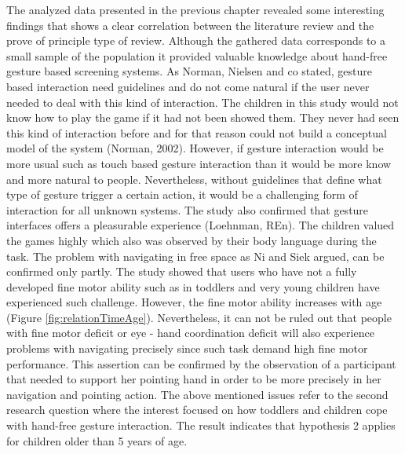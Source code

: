 The analyzed data presented in the previous chapter revealed some interesting findings that shows a clear correlation between the literature review and the prove of principle type of review. Although the gathered data corresponds to a small sample of the population it provided valuable knowledge about hand-free gesture based screening systems. As Norman, Nielsen and co stated, gesture based interaction need guidelines and do not come natural if the user never needed to deal with this kind of interaction. The children in this study would not know how to play the game if it had not been showed them. They never had seen this kind of interaction before and for that reason could not build a conceptual model of the system (Norman, 2002). However, if gesture interaction would be more usual such as touch based gesture interaction than it would be more know and more natural to people. Nevertheless, without guidelines that define what type of gesture trigger a certain action, it would be a challenging form of interaction for all unknown systems. 
The study also confirmed that gesture interfaces offers a pleasurable experience (Loehnman, REn). The children valued the games highly which also was observed by their body language during the task. 
The problem with navigating in free space as Ni and Siek argued, can be confirmed only partly. The study showed that users who have not a fully developed fine motor ability such as in toddlers and very young children have experienced such challenge. However, the fine motor ability increases with age (Figure \ref{fig:relationTimeAge}). Nevertheless, it can not be ruled out that people with fine motor deficit or eye - hand coordination deficit will also experience problems with navigating precisely since such task demand high fine motor performance. This assertion can be confirmed by the observation of a participant that needed to support her pointing hand in order to be more precisely in her navigation and pointing action. 
The above mentioned issues refer to the second research question where the interest focused on how toddlers and children cope with hand-free gesture interaction. The result indicates that hypothesis 2 applies for children older than 5 years of age.

